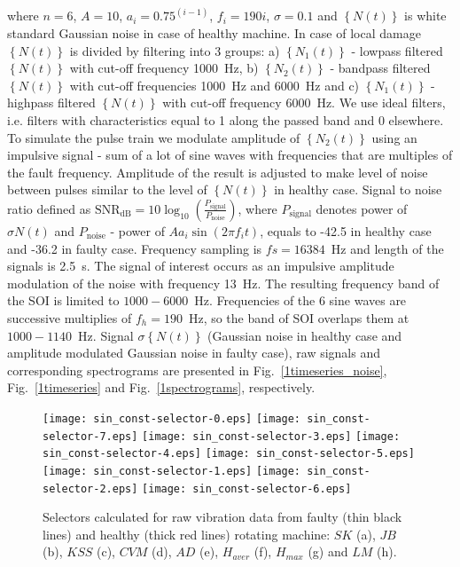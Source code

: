 \documentclass[3p,times]{elsarticle}
\begin{document}
where $n=6$, $A=10$, $a_i=0.75^{(i-1)}$, $f_i=190i$, $\sigma=0.1$ and $\left\{N(t)\right\}$ is white standard Gaussian noise in case of healthy machine. In case of local damage $\left\{N(t)\right\}$ is divided by filtering into 3 groups: a) $\left\{N_1(t)\right\}$ - lowpass filtered $\left\{N(t)\right\}$ with cut-off frequency 1000~Hz, b) $\left\{N_2(t)\right\}$ - bandpass filtered $\left\{N(t)\right\}$ with cut-off frequencies 1000~Hz and 6000~Hz and c) $\left\{N_1(t)\right\}$ - highpass filtered $\left\{N(t)\right\}$ with cut-off frequency 6000~Hz. We use ideal filters, i.e. filters with characteristics equal to 1 along the passed band and 0 elsewhere. To simulate the pulse train we modulate amplitude of $\left\{N_2(t)\right\}$ using an impulsive signal - sum of a lot of sine waves with frequencies that are multiples of the fault frequency. Amplitude of the result is adjusted to make level of noise between pulses similar to the level of $\left\{N(t)\right\}$ in healthy case.  Signal to noise ratio defined as $\mathrm{SNR_{dB}} = 10 \log_{10} \left ( \frac{P_\mathrm{signal}}{P_\mathrm{noise}} \right )$, where $P_\mathrm{signal}$ denotes power of $\sigma N(t)$ and $P_\mathrm{noise}$ - power of $A a_i \sin(2\pi f_i t)$, equals to -42.5 in healthy case and -36.2 in faulty case. Frequency sampling is $fs=16384$~Hz and length of the signals is 2.5~s. The signal of interest occurs as an impulsive amplitude modulation of the noise with frequency 13~Hz. The resulting frequency band of the SOI is limited to $1000-6000$~Hz. Frequencies of the 6 sine waves are successive multiplies of $f_h=190$~Hz, so the band of SOI overlaps them at $1000-1140$~Hz. Signal $\sigma \left\{N(t)\right\}$ (Gaussian noise in healthy case and amplitude modulated Gaussian noise in faulty case), raw signals and corresponding spectrograms are presented in Fig.~\ref{1timeseries_noise}, Fig.~\ref{1timeseries} and Fig.~\ref{1spectrograms}, respectively.
\begin{figure}[!ht]
\begin{center}
\texttt{[image: sin\_const-selector-0.eps]}
\texttt{[image: sin\_const-selector-7.eps]}
\texttt{[image: sin\_const-selector-3.eps]}
\texttt{[image: sin\_const-selector-4.eps]}
\texttt{[image: sin\_const-selector-5.eps]}
\texttt{[image: sin\_const-selector-1.eps]}
\texttt{[image: sin\_const-selector-2.eps]}
\texttt{[image: sin\_const-selector-6.eps]}
\caption{Selectors calculated for raw vibration data from faulty (thin black lines) and healthy (thick red lines) rotating machine: $SK$ (a), $JB$ (b), $KSS$ (c), $CVM$ (d), $AD$ (e), $H_{aver}$ (f), $H_{max}$ (g) and $LM$ (h).}
\label{1selectors}
\end{center}
\end{figure}
\end{document}
